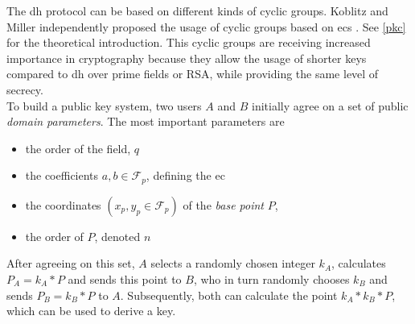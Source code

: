 The \gls{dh} protocol can be based on different kinds of cyclic groups. Koblitz and Miller independently proposed the usage of cyclic groups based on
\glspl{ec} \cite{eccKoblitz} \cite{eccMiller}. See \ref{pkc} for the theoretical introduction.
This cyclic groups are receiving increased importance in cryptography because they allow the usage
of shorter keys compared to \gls{dh} over prime fields or RSA, while providing the same level of secrecy.
\\
To build a public key system, two users $A$ and $B$ initially agree on a set of public \textit{domain parameters}. The most important parameters are \cite{ecDP}	
\begin{itemize}
 \item the order of the field, $q$
 \item the coefficients $a, b \in \mathcal{F}_p$, defining the \gls{ec}
 \item the coordinates $(x_p, y_p \in \mathcal{F}_p)$ of the \textit{base point} $P$, 
 \item the order of $P$, denoted $n$
\end{itemize}
After agreeing on this set, $A$ selects a randomly chosen integer $k_A$, calculates $P_A = k_A*P$ and sends
this point to $B$, who in turn randomly chooses $k_B$ and sends $P_B = k_B*P$ to $A$. Subsequently, both can calculate the point $k_A*k_B*P$, which can be used
to derive a key.

